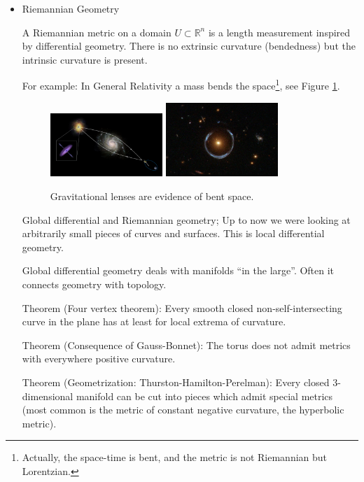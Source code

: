 \documentclass[a4paper,11pt,notitlepage,fullpage]{paper}
\theoremstyle{plain}
\theoremstyle{definition}
\begin{document}
\begin{itemize}
\item Riemannian Geometry

A Riemannian metric on a domain $U \subset \mathbb R^n$ is a length measurement inspired by differential geometry. There is no extrinsic curvature (bendedness) but the intrinsic curvature is present.

For example: In General Relativity a mass bends the space\footnote{Actually, the space-time is bent, and the metric is not Riemannian but Lorentzian.}, see Figure \ref{fig:gravlens}.

\begin{figure}
\centering
\includegraphics[width = 0.4\textwidth]{img/gravlens1}
\includegraphics[width = 0.4\textwidth]{img/gravlens2}
\caption{Gravitational lenses are evidence of bent space.}
\label{fig:gravlens}
\end{figure}


Global differential and Riemannian geometry;
Up to now we were looking at arbitrarily small pieces of curves and surfaces. This is local differential geometry.

Global differential geometry deals with manifolds ``in the large''.
Often it connects geometry with topology.


Theorem (Four vertex theorem): Every smooth closed non-self-intersecting curve in the plane has at least for local extrema of curvature.

Theorem (Consequence of Gauss-Bonnet): The torus does not admit metrics with everywhere positive curvature.

Theorem (Geometrization: Thurston-Hamilton-Perelman): Every closed 3-dimensional manifold can be cut into pieces which admit special metrics (most common is the metric of constant negative curvature, the hyperbolic metric).

\end{itemize}
\end{document}
